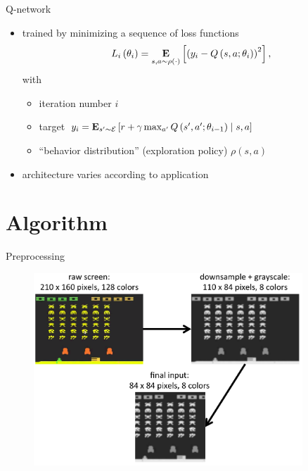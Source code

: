 \begin{frame}{Q-network}
    \begin{itemize}\itemsep=12pt

        \item trained by minimizing a sequence of loss functions
        \[
            L_{i}\left(\theta_{i}\right) =
            \mathop{\bf E{}}_{s,a \sim \rho\left(\cdot\right)}
            \left[\left(y_{i} - Q\left(s,a;\theta_{i}\right)\right)^{2}\right],
        \]
        with
        \vspace*{0.5em}
        \begin{itemize}\itemsep=12pt
            \item iteration number $i$
            \item target $y_{i} = \mathop{\bf E{}}_{s'\sim\mathcal{E}}\left[ r + \gamma\max_{a'}Q\left(s',a';\theta_{i-1}\right) \mid s,a \right]$
            \item ``behavior distribution'' (exploration policy) $\rho\left(s,a\right)$
        \end{itemize}

        \item architecture varies according to application

    \end{itemize}
\end{frame}

\section{Algorithm}

\begin{frame}{Preprocessing}
    \begin{figure}
        \centering
        \includegraphics[width=0.9\textwidth]{process.pdf}
    \end{figure}
\end{frame}

